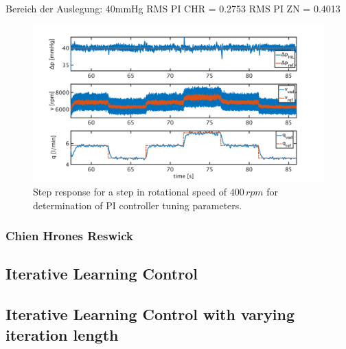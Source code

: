 
Bereich der Auslegung: 40mmHg
RMS PI CHR = 0.2753
RMS PI ZN = 0.4013


\begin{figure}[ht]
  \centering
  \includegraphics[width=\textwidth]{images/chapt_5/pi_contr_zn_40.pdf}
  \caption[Step response for determination of PI controller tuning parameters]{Step response for a step in rotational speed of $400\,rpm$ for determination of PI controller tuning parameters.}
  \label{fig:pi_contr_zn_40}
\end{figure}
\subsubsection{Chien Hrones Reswick}
\subsection{Iterative Learning Control}
\subsection{Iterative Learning Control with varying iteration length}
%
%
